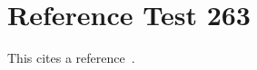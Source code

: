 \documentclass{article}
\begin{document}
\section{Reference Test 263}
This cites a reference~\cite{test263}.

\end{document}
